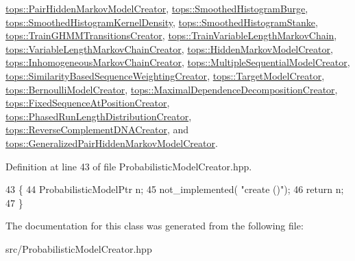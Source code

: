 \hyperlink{classtops_1_1PairHiddenMarkovModelCreator_aa426cbbbcd7af43cd92f62d71e30b129}{tops\+::\+Pair\+Hidden\+Markov\+Model\+Creator}, \hyperlink{classtops_1_1SmoothedHistogramBurge_a7f148c400879d8594da5fedda12641b1}{tops\+::\+Smoothed\+Histogram\+Burge}, \hyperlink{classtops_1_1SmoothedHistogramKernelDensity_a4d3c3a63d0810ef133a14855fd937a8e}{tops\+::\+Smoothed\+Histogram\+Kernel\+Density}, \hyperlink{classtops_1_1SmoothedHistogramStanke_a2d04479a872f3f139652a55632a27e00}{tops\+::\+Smoothed\+Histogram\+Stanke}, \hyperlink{classtops_1_1TrainGHMMTransitionsCreator_a83d716ee938b4ccbc76b110d4b6b7ae9}{tops\+::\+Train\+G\+H\+M\+M\+Transitions\+Creator}, \hyperlink{classtops_1_1TrainVariableLengthMarkovChain_a67d4799e147f66deb1646d1ba45f7e65}{tops\+::\+Train\+Variable\+Length\+Markov\+Chain}, \hyperlink{classtops_1_1VariableLengthMarkovChainCreator_a7b5275f19b97f4060274a7f8ec4f016b}{tops\+::\+Variable\+Length\+Markov\+Chain\+Creator}, \hyperlink{classtops_1_1HiddenMarkovModelCreator_a91a39f3246a9da001388e8de75b29964}{tops\+::\+Hidden\+Markov\+Model\+Creator}, \hyperlink{classtops_1_1InhomogeneousMarkovChainCreator_ac31f56513eef40d55c7e09dcfa5a80c8}{tops\+::\+Inhomogeneous\+Markov\+Chain\+Creator}, \hyperlink{classtops_1_1MultipleSequentialModelCreator_acfa2befa902d9dd44ae84cefd2b9c452}{tops\+::\+Multiple\+Sequential\+Model\+Creator}, \hyperlink{classtops_1_1SimilarityBasedSequenceWeightingCreator_a8d0c396745a850e8fd2f17df6d4244b5}{tops\+::\+Similarity\+Based\+Sequence\+Weighting\+Creator}, \hyperlink{classtops_1_1TargetModelCreator_ac50e4d0f68f47511d4c5b9683cba11b4}{tops\+::\+Target\+Model\+Creator}, \hyperlink{classtops_1_1BernoulliModelCreator_a7269fc3cbc7bef0bc7456e6cf2ec44b3}{tops\+::\+Bernoulli\+Model\+Creator}, \hyperlink{classtops_1_1MaximalDependenceDecompositionCreator_a9d90148ccc1e27acc090f549d7c442af}{tops\+::\+Maximal\+Dependence\+Decomposition\+Creator}, \hyperlink{classtops_1_1FixedSequenceAtPositionCreator_af4daf171afbef0494ee98f9877ff1787}{tops\+::\+Fixed\+Sequence\+At\+Position\+Creator}, \hyperlink{classtops_1_1PhasedRunLengthDistributionCreator_aaf3fd1675098f4f5c3e4da8f06056ab1}{tops\+::\+Phased\+Run\+Length\+Distribution\+Creator}, \hyperlink{classtops_1_1ReverseComplementDNACreator_a9928572204114498356297cf0892019b}{tops\+::\+Reverse\+Complement\+D\+N\+A\+Creator}, and \hyperlink{classtops_1_1GeneralizedPairHiddenMarkovModelCreator_a0f83a29fb5bf772d82ce311ba3e16216}{tops\+::\+Generalized\+Pair\+Hidden\+Markov\+Model\+Creator}.



Definition at line 43 of file Probabilistic\+Model\+Creator.\+hpp.


\begin{DoxyCode}
43                                                                                            \{
44       ProbabilisticModelPtr n;
45       not\_implemented( \textcolor{stringliteral}{"create ()"});
46       \textcolor{keywordflow}{return} n;
47     \}
\end{DoxyCode}


The documentation for this class was generated from the following file\+:\begin{DoxyCompactItemize}
\item 
src/Probabilistic\+Model\+Creator.\+hpp\end{DoxyCompactItemize}
